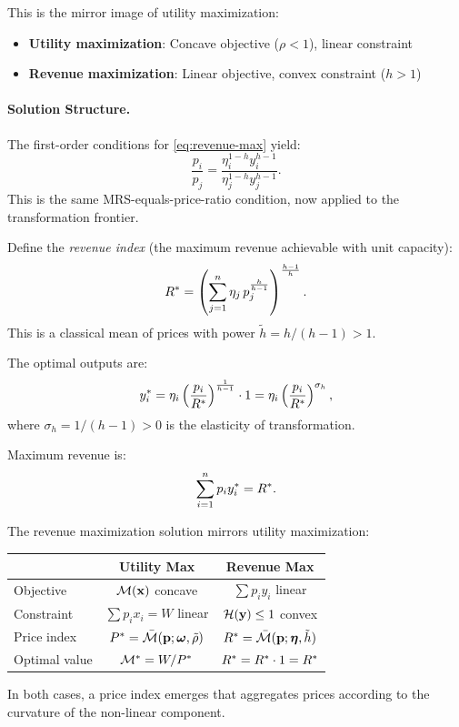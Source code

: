 This is the mirror image of utility maximization:
\begin{itemize}[leftmargin=2em]
\item \textbf{Utility maximization}: Concave objective ($\rho < 1$), linear constraint
\item \textbf{Revenue maximization}: Linear objective, convex constraint ($h > 1$)
\end{itemize}

\paragraph{Solution Structure.}
The first-order conditions for \cref{eq:revenue-max} yield:
\begin{equation}
\frac{p_i}{p_j} = \frac{\eta_i^{1-h} y_i^{h-1}}{\eta_j^{1-h} y_j^{h-1}}.
\end{equation}
This is the same MRS-equals-price-ratio condition, now applied to the transformation frontier.

Define the \emph{revenue index} (the maximum revenue achievable with unit capacity):
\begin{equation}
\label{eq:revenue-index}
R^{*} = \left( \sum_{j=1}^{n} \eta_j \, p_j^{\frac{h}{h-1}} \right)^{\frac{h-1}{h}}.
\end{equation}
This is a classical mean of prices with power $\tilde{h} = h/(h-1) > 1$.

The optimal outputs are:
\begin{equation}
y_i^* = \eta_i \left( \frac{p_i}{R^{*}} \right)^{\frac{1}{h-1}} \cdot 1 = \eta_i \left( \frac{p_i}{R^{*}} \right)^{\sigma_h},
\end{equation}
where $\sigma_h = 1/(h-1) > 0$ is the elasticity of transformation.

Maximum revenue is:
\begin{equation}
\sum_{i=1}^{n} p_i y_i^* = R^{*}.
\end{equation}

\begin{calloutnote}
The revenue maximization solution mirrors utility maximization:
\begin{center}
\renewcommand{\arraystretch}{1.4}
\begin{tabular}{@{}lcc@{}}
\toprule
& \textbf{Utility Max} & \textbf{Revenue Max} \\
\midrule
Objective & $\mathcal{M}(\mathbf{x})$ concave & $\sum p_i y_i$ linear \\
Constraint & $\sum p_i x_i = W$ linear & $\mathcal{H}(\mathbf{y}) \leq 1$ convex \\
Price index & $P^{*} = \bar{\mathcal{M}}(\mathbf{p}; \boldsymbol{\omega}, \tilde{\rho})$ & $R^{*} = \bar{\mathcal{M}}(\mathbf{p}; \bm{\eta}, \tilde{h})$ \\
Optimal value & $\mathcal{M}^* = W / P^{*}$ & $R^* = R^{*} \cdot 1 = R^{*}$ \\
\bottomrule
\end{tabular}
\end{center}
In both cases, a price index emerges that aggregates prices according to the curvature of the non-linear component.
\end{calloutnote}

